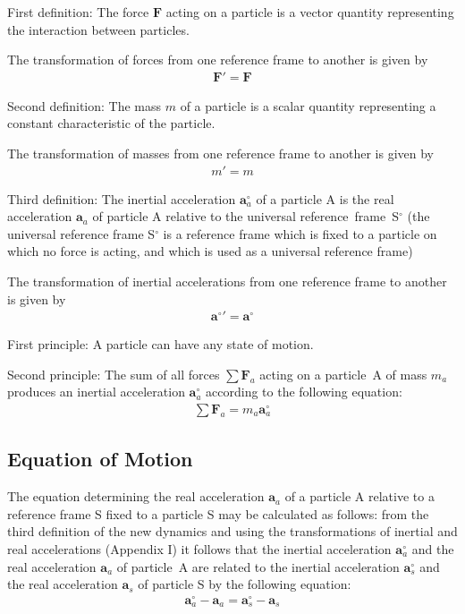 \documentclass[11pt]{article}
\newcommand{\vA}{\mathbf{a}}
\newcommand{\vF}{\mathbf{F}}
\newcommand{\mM}{m}
\newcommand{\rt}{'}
\newcommand{\ra}{_a}
\newcommand{\rs}{_s}
\begin{document}
\par First definition: The force $\vF$ acting on a particle is a vector quantity representing the interaction between particles.
\par The transformation of forces from one reference frame to another is given by
\begin{eqnarray*}
\vF\rt = \vF
\end{eqnarray*}
\par Second definition: The mass $\mM$ of a particle is a scalar quantity representing a constant characteristic of the particle.
\par The transformation of masses from one reference frame to another is given by
\begin{eqnarray*}
\mM\rt = \mM
\end{eqnarray*}
\par Third definition: The inertial acceleration $\vA^{\circ}\ra$ of a particle A is the real acceleration $\vA\ra$ of particle A relative to the universal \hbox {reference frame \hspace{-0.06em}S$^{\circ}$} (the universal reference frame S$^{\circ}$ is a reference frame which is fixed to a particle on which no force is acting, and which is used as a universal reference frame)
\par The transformation of inertial accelerations from one reference frame to another is given by
\begin{eqnarray*}
\vA^{\circ}{\rt} = \vA^{\circ}
\end{eqnarray*}
\par First principle: A particle can have any state of motion.
\par Second principle: The sum of all forces $\sum \vF\ra$ acting on a \hbox {particle A} of mass $\mM\ra$ produces an inertial acceleration $\vA^{\circ}\ra$ according to the following equation:
\begin{eqnarray*}
\sum \vF\ra = \mM\ra\vA^{\circ}\ra
\end{eqnarray*}

\medskip

{\centering\subsection*{Equation of Motion}}

\par The equation determining the real acceleration $\vA\ra$ of a particle A relative to a reference frame S fixed to a particle S may be calculated as follows: from the third definition of the new dynamics and using the transformations of inertial and real accelerations (Appendix I) it follows that the inertial acceleration $\vA^{\circ}\ra$ and the real acceleration $\vA\ra$ of \hbox {particle A} are related to the inertial acceleration $\vA^{\circ}\rs$ and the real acceleration $\vA\rs$ of particle S by the following equation:
\begin{eqnarray*}
\vA^{\circ}\ra - \vA\ra = \vA^{\circ}\rs - \vA\rs
\end{eqnarray*}
\end{document}
